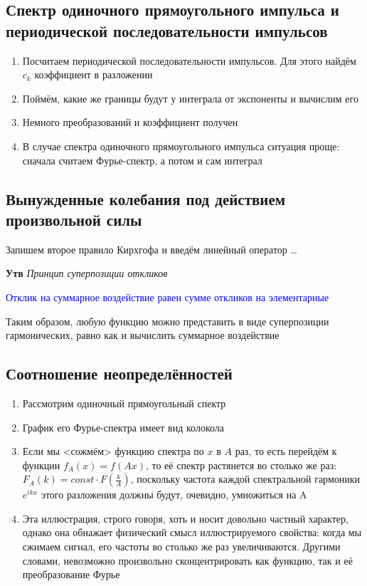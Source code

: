 \documentclass[a4paper, 14pt]{article}
\begin{document}
    \subsection{Спектр одиночного прямоугольного импульса и периодической последовательности импульсов}
    
    \begin{enumerate}
        \item Посчитаем периодической последовательности импульсов.
        Для этого найдём $c_k$ коэффициент в разложении
        \item Поймём, какие же границы будут у интеграла от экспоненты и вычислим его
        \item Немного преобразований и коэффициент получен
        \item В случае спектра одиночного прямоугольного импульса ситуация проще: сначала считаем Фурье-спектр, а
        потом и сам интеграл
    \end{enumerate}
    
    \subsection{Вынужденные колебания под действием произвольной силы}
    
    Запишем второе правило Кирхгофа и введём линейный оператор \ldots
    
    \textbf{Утв} \textit{Принцип суперпозиции откликов}
    
    \textcolor{blue}{Отклик на суммарное воздействие равен сумме откликов на элементарные}
    
    Таким образом, любую функцию можно представить в виде суперпозиции гармонических, равно как и вычислить суммарное
    воздействие
    
    \subsection{Соотношение неопределённостей}
    
    \begin{enumerate}
        \item Рассмотрим одиночный прямоугольный спектр
        \item График его Фурье-спектра имеет вид колокола
        \item Если мы <сожмём> функцию спектра по $x$ в $A$ раз, то есть перейдём к функции $f_A(x) = f(Ax)$, то её
        спектр растянется во столько же раз: $F_A(k) = const \cdot F\left(\frac{k}{A}\right)$, поскольку частота каждой
        спектральной
        гармоники $e^{ikx}$ этого разложения должны будут, очевидно, умножиться на A
        \item Эта иллюстрация, строго говоря, хоть и носит довольно частный характер, однако она обнажает
        физический смысл иллюстрируемого свойства: когда мы сжимаем сигнал, его частоты во столько же раз увеличиваются.
        Другими словами, невозможно произвольно сконцентрировать как функцию, так и её преобразование Фурье
    \end{enumerate}
    
\end{document}
